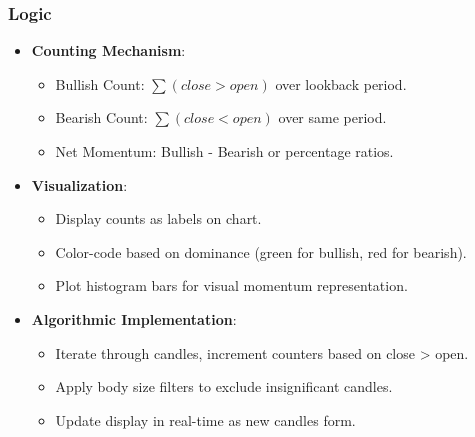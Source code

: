 \documentclass[12pt]{article}
\begin{document}
\subsubsection{Logic}
\begin{itemize}
\item \textbf{Counting Mechanism}:
  \begin{itemize}
  \item Bullish Count: \( \sum (close > open) \) over lookback period.
  \item Bearish Count: \( \sum (close < open) \) over same period.
  \item Net Momentum: Bullish - Bearish or percentage ratios.
  \end{itemize}
\item \textbf{Visualization}:
  \begin{itemize}
  \item Display counts as labels on chart.
  \item Color-code based on dominance (green for bullish, red for bearish).
  \item Plot histogram bars for visual momentum representation.
  \end{itemize}
\item \textbf{Algorithmic Implementation}:
  \begin{itemize}
  \item Iterate through candles, increment counters based on close > open.
  \item Apply body size filters to exclude insignificant candles.
  \item Update display in real-time as new candles form.
  \end{itemize}
\end{itemize}
\end{document}
